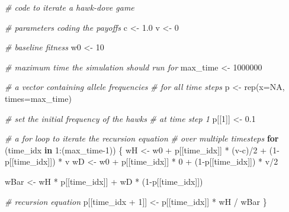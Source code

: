 \documentclass[
]{book}
\newenvironment{Shaded}{\begin{snugshade}}{\end{snugshade}}
\newcommand{\AttributeTok}[1]{\textcolor[rgb]{0.77,0.63,0.00}{#1}}
\newcommand{\CommentTok}[1]{\textcolor[rgb]{0.56,0.35,0.01}{\textit{#1}}}
\newcommand{\ConstantTok}[1]{\textcolor[rgb]{0.00,0.00,0.00}{#1}}
\newcommand{\ControlFlowTok}[1]{\textcolor[rgb]{0.13,0.29,0.53}{\textbf{#1}}}
\newcommand{\DecValTok}[1]{\textcolor[rgb]{0.00,0.00,0.81}{#1}}
\newcommand{\FloatTok}[1]{\textcolor[rgb]{0.00,0.00,0.81}{#1}}
\newcommand{\FunctionTok}[1]{\textcolor[rgb]{0.00,0.00,0.00}{#1}}
\newcommand{\NormalTok}[1]{#1}
\newcommand{\OtherTok}[1]{\textcolor[rgb]{0.56,0.35,0.01}{#1}}
\newcommand{\SpecialCharTok}[1]{\textcolor[rgb]{0.00,0.00,0.00}{#1}}
\begin{document}
\begin{Shaded}
\begin{Highlighting}[]
\CommentTok{\# code to iterate a hawk{-}dove game}


\CommentTok{\# parameters coding the payoffs}
\NormalTok{c }\OtherTok{\textless{}{-}} \FloatTok{1.0}
\NormalTok{v }\OtherTok{\textless{}{-}} \DecValTok{0}

\CommentTok{\# baseline fitness}
\NormalTok{w0 }\OtherTok{\textless{}{-}} \DecValTok{10}

\CommentTok{\# maximum time the simulation should run for}
\NormalTok{max\_time }\OtherTok{\textless{}{-}} \DecValTok{1000000}

\CommentTok{\# a vector containing allele frequencies}
\CommentTok{\# for all time steps}
\NormalTok{p }\OtherTok{\textless{}{-}} \FunctionTok{rep}\NormalTok{(}\AttributeTok{x=}\ConstantTok{NA}\NormalTok{, }\AttributeTok{times=}\NormalTok{max\_time)}

\CommentTok{\# set the initial frequency of the hawks}
\CommentTok{\# at time step 1}
\NormalTok{p[[}\DecValTok{1}\NormalTok{]] }\OtherTok{\textless{}{-}} \FloatTok{0.1}

\CommentTok{\# a for loop to iterate the recursion equation}
\CommentTok{\# over multiple timesteps}
\ControlFlowTok{for}\NormalTok{ (time\_idx }\ControlFlowTok{in} \DecValTok{1}\SpecialCharTok{:}\NormalTok{(max\_time}\DecValTok{{-}1}\NormalTok{))}
\NormalTok{\{}
\NormalTok{  wH }\OtherTok{\textless{}{-}}\NormalTok{ w0 }\SpecialCharTok{+}\NormalTok{ p[[time\_idx]] }\SpecialCharTok{*}\NormalTok{ (v}\SpecialCharTok{{-}}\NormalTok{c)}\SpecialCharTok{/}\DecValTok{2} \SpecialCharTok{+}\NormalTok{ (}\DecValTok{1}\SpecialCharTok{{-}}\NormalTok{p[[time\_idx]]) }\SpecialCharTok{*}\NormalTok{ v}
\NormalTok{  wD }\OtherTok{\textless{}{-}}\NormalTok{ w0 }\SpecialCharTok{+}\NormalTok{ p[[time\_idx]] }\SpecialCharTok{*} \DecValTok{0} \SpecialCharTok{+}\NormalTok{ (}\DecValTok{1}\SpecialCharTok{{-}}\NormalTok{p[[time\_idx]]) }\SpecialCharTok{*}\NormalTok{ v}\SpecialCharTok{/}\DecValTok{2}

\NormalTok{  wBar }\OtherTok{\textless{}{-}}\NormalTok{ wH }\SpecialCharTok{*}\NormalTok{ p[[time\_idx]] }\SpecialCharTok{+}\NormalTok{ wD }\SpecialCharTok{*}\NormalTok{ (}\DecValTok{1}\SpecialCharTok{{-}}\NormalTok{p[[time\_idx]])}

  \CommentTok{\# recursion equation}
\NormalTok{  p[[time\_idx }\SpecialCharTok{+} \DecValTok{1}\NormalTok{]] }\OtherTok{\textless{}{-}}\NormalTok{ p[[time\_idx]] }\SpecialCharTok{*}\NormalTok{ wH }\SpecialCharTok{/}\NormalTok{ wBar}
\NormalTok{\}}
\end{Highlighting}
\end{Shaded}
\end{document}
